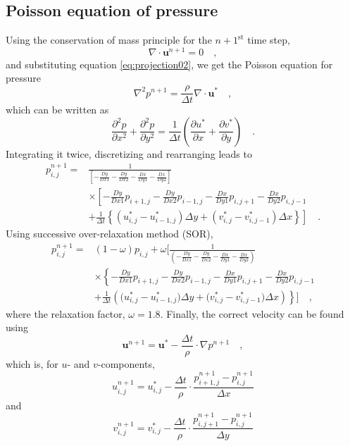 \documentclass[12pt,a4paper,fleqn]{article}
\begin{document}
\subsection{Poisson equation of pressure}
Using the conservation of mass principle for the $n+1^{\text{st}}$ time step,
\begin{equation} \label{eq:continuity-n+1}
\nabla \cdot \mathbf{u}^{n+1} = 0 \quad ,
\end{equation}
and substituting equation \eqref{eq:projection02}, we get the Poisson equation for pressure
\begin{equation} \label{eq:poisson}
\nabla^2 p^{n+1} = \frac{\rho}{\Delta t}\nabla \cdot \mathbf{u}^* \quad ,
\end{equation}
which can be written as
\begin{equation} \label{eq:poisson-components}
\frac{\partial^2 p}{\partial x^2} + \frac{\partial^2 p}{\partial y^2}
= \frac{1}{\Delta t} \left(\frac{\partial u^*}{\partial x} + \frac{\partial v^*}{\partial y}\right) \quad .
\end{equation}
Integrating it twice, discretizing and rearranging leads to
\begin{align}
p_{i,j}^{n+1} =
&\frac{1}{\left[ - \frac{Dy}{Dx1} - \frac{Dy}{Dx2} - \frac{Dx}{Dy1} - \frac{Dx}{Dy2} \right]}
\nonumber \\
&\times
\left[
- \frac{Dy}{Dx1}p_{i+1,j} - \frac{Dy}{Dx2}p_{i-1,j} - \frac{Dx}{Dy1}p_{i,j+1} - \frac{Dx}{Dy2}p_{i,j-1}
\right. \nonumber \\
&\left.
+ \frac{1}{\Delta t}\left\{
\left(u^*_{i,j}-u^*_{i-1,j}\right) \Delta y
+ \left(v^*_{i,j}-v^*_{i,j-1}\right) \Delta x
\right\}
\right]
\quad .
\end{align}
Using successive over-relaxation method (SOR),
\begin{align}
p_{i,j}^{n+1} =& \left(1 - \omega\right)p_{i,j} + \omega
\Bigg[
\frac{1}{\left( - \frac{Dy}{Dx1} - \frac{Dy}{Dx2} - \frac{Dx}{Dy1} - \frac{Dx}{Dy2} \right)}
\nonumber \\
&\times
\left\{
- \frac{Dy}{Dx1}p_{i+1,j} - \frac{Dy}{Dx2}p_{i-1,j} - \frac{Dx}{Dy1}p_{i,j+1} - \frac{Dx}{Dy2}p_{i,j-1}
\right. \nonumber \\
&\left.
+ \frac{1}{\Delta t}\left(
\big(u^*_{i,j}-u^*_{i-1,j}\big) \Delta y
+ \big(v^*_{i,j}-v^*_{i,j-1}\big) \Delta x
\right)
\right\}
\Bigg]
\quad ,
\end{align}
where the relaxation factor, $\omega = 1.8$.
Finally, the correct velocity can be found using
\begin{equation}
\mathbf{u}^{n+1} = \mathbf{u}^* - \frac{\Delta t}{\rho}\cdot \nabla p^{n+1} \quad ,
\end{equation}
which is, for $u$- and $v$-components,
\begin{equation}
u^{n+1}_{i,j} = u^*_{i,j} - \frac{\Delta t}{\rho}\cdot \frac{p_{i+1,j}^{n+1} - p_{i,j}^{n+1}}{\Delta x}
\end{equation}
and
\begin{equation}
v^{n+1}_{i,j} = v^*_{i,j} - \frac{\Delta t}{\rho}\cdot \frac{p_{i,j+1}^{n+1} - p_{i,j}^{n+1}}{\Delta y}
\end{equation}
\end{document}
